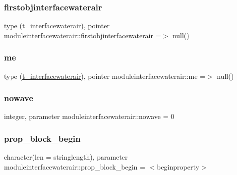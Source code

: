 \subsubsection{\texorpdfstring{firstobjinterfacewaterair}{firstobjinterfacewaterair}}
{\footnotesize\ttfamily type (\mbox{\hyperlink{structmoduleinterfacewaterair_1_1t__interfacewaterair}{t\+\_\+interfacewaterair}}), pointer moduleinterfacewaterair\+::firstobjinterfacewaterair =$>$ null()\hspace{0.3cm}{\ttfamily [private]}}

\mbox{\label{namespacemoduleinterfacewaterair_afff814b0fb4c5feeb5a9e6278d4f6fb5}} 
\subsubsection{\texorpdfstring{me}{me}}
{\footnotesize\ttfamily type (\mbox{\hyperlink{structmoduleinterfacewaterair_1_1t__interfacewaterair}{t\+\_\+interfacewaterair}}), pointer moduleinterfacewaterair\+::me =$>$ null()\hspace{0.3cm}{\ttfamily [private]}}

\mbox{\label{namespacemoduleinterfacewaterair_a9e6fc9893e6a61442860c5361e65ef24}} 
\subsubsection{\texorpdfstring{nowave}{nowave}}
{\footnotesize\ttfamily integer, parameter moduleinterfacewaterair\+::nowave = 0\hspace{0.3cm}{\ttfamily [private]}}

\mbox{\label{namespacemoduleinterfacewaterair_a5b4bd7da5a9e3e4da1bfe7edd8b805ac}} 
\subsubsection{\texorpdfstring{prop\+\_\+block\+\_\+begin}{prop\_block\_begin}}
{\footnotesize\ttfamily character(len = stringlength), parameter moduleinterfacewaterair\+::prop\+\_\+block\+\_\+begin = \textquotesingle{}$<$beginproperty$>$\textquotesingle{}\hspace{0.3cm}{\ttfamily [private]}}

